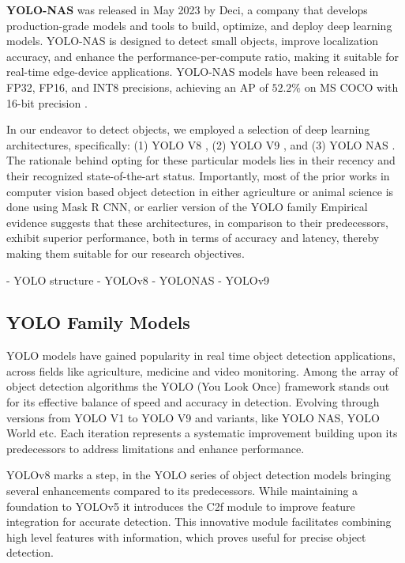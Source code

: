 \textbf{YOLO-NAS} \cite{ultralyticsYOLONASNeural} was released in May 2023 by Deci, a company that develops production-grade models and tools to
build, optimize, and deploy deep learning models. YOLO-NAS is designed to detect small objects, improve localization
accuracy, and enhance the performance-per-compute ratio, making it suitable for real-time edge-device applications. YOLO-NAS models have been released in FP32, FP16, and INT8 precisions, achieving an AP of
$52.2\%$ on MS COCO with 16-bit precision 
\cite{terven2304comprehensive}.




In our endeavor to detect objects, we employed a selection of deep learning architectures, specifically: (1) YOLO V8 \cite{ultralyticsYOLOv8}, (2) YOLO V9 \cite{wang2024yolov9}, and (3) YOLO NAS \cite{ultralyticsYOLONASNeural}. The rationale behind opting for these particular models lies in their recency and their recognized state-of-the-art status. Importantly, most of the prior works in computer vision based object detection in either agriculture or animal science is done using Mask R CNN, or earlier version of the YOLO family Empirical evidence suggests that these architectures, in comparison to their predecessors, exhibit superior performance, both in terms of accuracy and latency, thereby making them suitable for our research objectives.


- YOLO structure
- YOLOv8
- YOLONAS
- YOLOv9



\subsection{YOLO Family Models}


YOLO models have gained popularity in real time object detection applications, across fields like agriculture, medicine and video monitoring. Among the array of object detection algorithms the YOLO (You Look Once) framework stands out for its effective balance of speed and accuracy in detection. Evolving through versions from YOLO V1 to YOLO V9 and variants, like YOLO NAS, YOLO World etc. Each iteration represents a systematic improvement building upon its predecessors to address limitations and enhance performance.


YOLOv8 \cite{ultralyticsYOLOv8} marks a step, in the YOLO series of object detection models bringing several enhancements compared to its predecessors. While maintaining a foundation to YOLOv5 \cite{Jocher2020YOLOv5} it introduces the C2f module to improve feature integration for accurate detection. This innovative module facilitates combining high level features with information, which proves useful for precise object detection.

